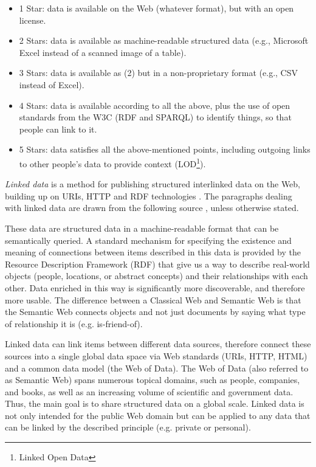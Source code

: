 			\begin{itemize}
				\item 1 Star: data is available on the Web (whatever format), but with an open license.
				\item 2 Stars: data is available as machine-readable structured data (e.g., Microsoft Excel instead of a scanned image of a table).
				\item 3 Stars: data is available as (2) but in a non-proprietary format (e.g., CSV instead of Excel).
				\item 4 Stars: data is available according to all the above, plus the use of open standards from the W3C (RDF and SPARQL) to identify things, so that people can link to it.
				\item 5 Stars: data satisfies all the above-mentioned points, including outgoing links to other people's data to provide context (LOD\footnote{Linked Open Data}).
			\end{itemize}	
						
				\textit{Linked data} is a method for publishing structured interlinked data on the Web, building up on URIs, HTTP and RDF technologies \cite{Heath2011}. The paragraphs dealing with linked data are drawn from the following source \cite{Heath2011}, unless otherwise stated. 
				
				These data are structured data in a machine-readable format that can be semantically queried. A standard mechanism for specifying the existence and meaning of connections between items described in this data is provided by the Resource Description Framework (RDF) that give us a way to describe real-world objects (people, locations, or abstract concepts) and their relationships with each other. Data enriched in this way is significantly more discoverable, and therefore more usable. The difference between a Classical Web and Semantic Web is that the Semantic Web connects objects and not just documents by saying what type of relationship it is (e.g. is-friend-of).
				
				Linked data can link items between different data sources, therefore connect these sources into a single global data space via Web standards (URIs, HTTP, HTML) and a common data model (the Web of Data). The Web of Data (also referred to as Semantic Web) spans numerous topical domains, such as people, companies, and books, as well as an increasing volume of scientific and government data. Thus, the main goal is to share structured data  on a global scale. Linked data is not only intended for the public Web domain but can be applied to any data that can be linked by the described principle (e.g. private or personal).
				
